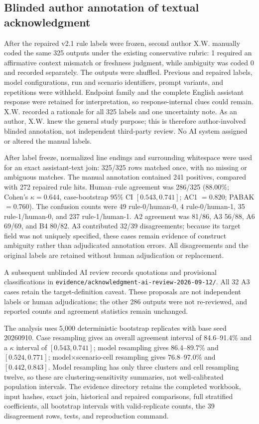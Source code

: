 \documentclass[preprint,12pt,authoryear]{elsarticle}
\newcommand{\code}[1]{\nolinkurl{#1}}
\begin{document}
\subsection{Blinded author annotation of textual acknowledgment}
\label{app:acknowledgment-annotation}
After the repaired v2.1 rule labels were frozen, second author X.W. manually coded the same 325 outputs under the existing conservative rubric: 1 required an affirmative context mismatch or freshness judgment, while ambiguity was coded 0 and recorded separately. The outputs were shuffled. Previous and repaired labels, model configurations, run and scenario identifiers, prompt variants, and repetitions were withheld. Endpoint family and the complete English assistant response were retained for interpretation, so response-internal clues could remain. X.W. recorded a rationale for all 325 labels and one uncertainty note. As an author, X.W. knew the general study purpose; this is therefore author-involved blinded annotation, not independent third-party review. No AI system assigned or altered the manual labels.

After label freeze, normalized line endings and surrounding whitespace were used for an exact assistant-text join: 325/325 rows matched once, with no missing or ambiguous matches. The manual annotation contained 241 positives, compared with 272 repaired rule hits. Human--rule agreement was 286/325 (88.00\%; Cohen's $\kappa=0.644$, case-bootstrap 95\% CI $[0.543,0.741]$; AC1 $=0.820$; PABAK $=0.760$). The confusion counts were 49 rule-0/human-0, 4 rule-0/human-1, 35 rule-1/human-0, and 237 rule-1/human-1. A2 agreement was 81/86, A3 56/88, A6 69/69, and B4 80/82. A3 contributed 32/39 disagreements; because its target field was not uniquely specified, these cases remain evidence of construct ambiguity rather than adjudicated annotation errors. All disagreements and the original labels are retained without human adjudication or replacement.

A subsequent unblinded AI review records quotations and provisional classifications in \code{evidence/acknowledgment-ai-review-2026-09-12/}. All 32 A3 cases retain the target-definition caveat. These proposals are not independent labels or human adjudications; the other 286 outputs were not re-reviewed, and reported counts and agreement statistics remain unchanged.



The analysis uses 5,000 deterministic bootstrap replicates with base seed 20260910. Case resampling gives an overall agreement interval of 84.6--91.4\% and a $\kappa$ interval of $[0.543,0.741]$; model resampling gives 86.4--89.7\% and $[0.524,0.771]$; model$\times$scenario-cell resampling gives 76.8--97.0\% and $[0.442,0.843]$. Model resampling has only three clusters and cell resampling twelve, so these are clustering-sensitivity summaries, not well-calibrated population intervals. The evidence directory retains the completed workbook, input hashes, exact join, historical and repaired comparisons, full stratified coefficients, all bootstrap intervals with valid-replicate counts, the 39 disagreement rows, tests, and reproduction command.
\end{document}
